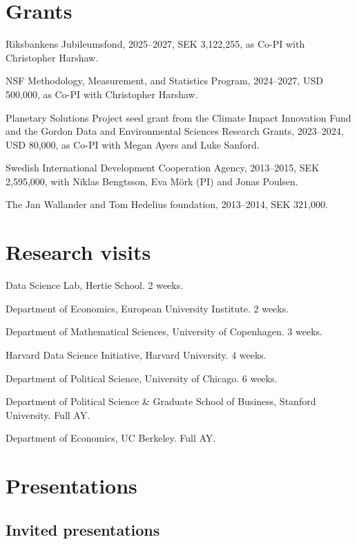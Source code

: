 \documentclass[10pt,letterpaper]{article}
\newenvironment{datelist}{
	\begin{list}{}{
		\setlength{\parskip}{0pt}
		\setlength{\itemsep}{4pt}
		\setlength{\parsep}{0.3em}
		\setlength{\leftmargin}{5.85em}
		\setlength{\labelwidth}{5.85em}
		\setlength{\labelsep}{1.5em}
		}
	}{
\end{list}
}
\newcommand{\dateitem}[2][]{\item[{#1}] {#2}}
\newenvironment{infolist}{
	\begin{list}{}{
		\setlength{\parskip}{0pt}
		\setlength{\itemsep}{4pt}
		\setlength{\parsep}{0.3em}
		\setlength{\leftmargin}{0em}
		\setlength{\labelwidth}{0em}
		}
	}{
\end{list}
}
\newcommand{\infoitem}[1]{\item {#1}}
\begin{document}
	\section*{Grants}

	\begin{infolist}
		\infoitem{Riksbankens Jubileumsfond, 2025--2027, SEK 3,122,255, as Co-PI with Christopher Harshaw.}
		\infoitem{NSF Methodology, Measurement, and Statistics Program, 2024--2027, USD 500,000, as Co-PI with Christopher Harshaw.}
		\infoitem{Planetary Solutions Project seed grant from the Climate Impact Innovation Fund and the Gordon Data and Environmental Sciences Research Grants, 2023--2024, USD 80,000, as Co-PI with Megan Ayers and Luke Sanford.}
		\infoitem{Swedish International Development Cooperation Agency, 2013--2015, SEK 2,595,000, with Niklas Bengtsson, Eva Mörk (PI) and Jonas Poulsen.}
		\infoitem{The Jan Wallander and Tom Hedelius foundation, 2013--2014, SEK 321,000.}
	\end{infolist}


	\section*{Research visits}

	\begin{datelist}
		\dateitem[2024]{Data Science Lab, Hertie School. 2 weeks.}
		\dateitem[2024]{Department of Economics, European University Institute. 2 weeks.}
		\dateitem[2024]{Department of Mathematical Sciences, University of Copenhagen. 3 weeks.}
		\dateitem[2024]{Harvard Data Science Initiative, Harvard University. 4 weeks.}
		\dateitem[2023]{Department of Political Science, University of Chicago. 6 weeks.}
		\dateitem[2019--2020]{Department of Political Science \& Graduate School of Business, Stanford University. Full AY.}
		\dateitem[2013--2014]{Department of Economics, UC Berkeley. Full AY.}
	\end{datelist}


	\section*{Presentations}

	\subsection*{Invited presentations}
\end{document}

